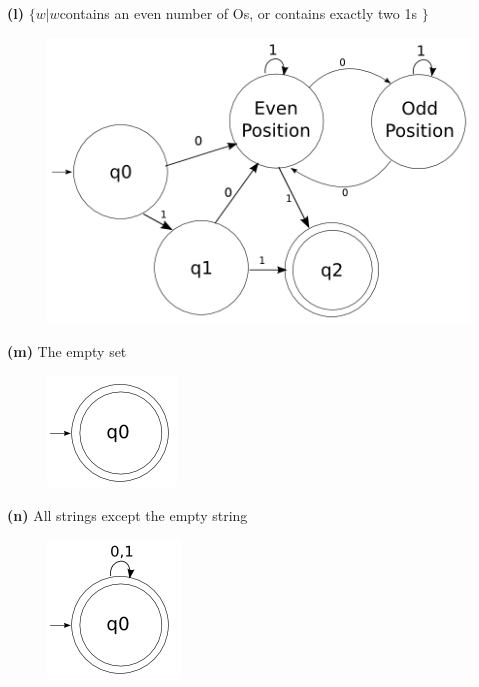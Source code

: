 \documentclass[11pt]{article}
\renewcommand{\part}[1] {\vspace{.10in} {\bf (#1)}}
\begin{document}
\part{l} $\{w | w $contains an even number of Os, or contains exactly two 1s $\}$
\begin{figure}[h!]
  \begin{center}
    \includegraphics[scale=0.40]{2l.png}
  \end{center}
\end{figure}

\part{m} The empty set 
\begin{figure}[h!]
  \begin{center}
    \includegraphics[scale=0.40]{2m.png}
  \end{center}
\end{figure}

\part{n} All strings except the empty string 
\begin{figure}[h!]
  \begin{center}
    \includegraphics[scale=0.40]{2n.png}
  \end{center}
\end{figure}
\end{document}
